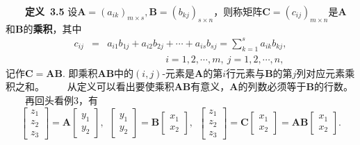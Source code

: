\documentclass[compress,mathserif,cjk]{beamer}
\theoremstyle{remark}
\numberwithin{equation}{section}
\newcommand{\hei}{\bf}      %
\begin{document}
\begin{CJK}{UTF8}{gbsn}
\begin{frame}
 \ \ \ \ {\hei 定义~3.5} 设$\bm A=(a_{ik})_{m\times s},\bm B=(b_{kj})_{s\times n}$，则称矩阵$\bm C=(c_{ij})_{m\times n}$是$\bm A$ 和$\bm B$的{\hei 乘积}，其中
 \begin{eqnarray*}
 c_{ij}&=&a_{i1}b_{1j}+a_{i2}b_{2j}+\cdots+a_{is}b_{sj}=\sum_{k=1}^sa_{ik}b_{kj},\\
 &&\hspace{6em}i=1,2,\cdots,m,~j=1,2,\cdots,n,
 \end{eqnarray*}
 记作$\bm C=\bm A\bm B$. 即乘积$\bm A\bm B$中的$(i,j)$-元素是$\bm A$的第$i$行元素与$\bm B$的第$j$列对应元素乘积之和。
 \pause\vskip 5pt
 \ \ \ \ 从定义可以看出要使乘积$\bm A\bm B$有意义，$\bm A$的列数必须等于$\bm B$的行数。
 \pause\vskip 10pt
 \ \ \ \  再回头看例3，有
 $$\left[\begin{matrix}z_1\\z_2\\z_3\end{matrix}\right]=\bm A\left[\begin{matrix}y_1\\y_2\end{matrix}\right],~~
 \left[\begin{matrix}y_1\\y_2\end{matrix}\right]=\bm B\left[\begin{matrix}x_1\\x_2\end{matrix}\right],~~
 \left[\begin{matrix}z_1\\z_2\\z_3\end{matrix}\right]=\bm C\left[\begin{matrix}x_1\\x_2\end{matrix}\right]=\bm A\bm B\left[\begin{matrix}x_1\\x_2\end{matrix}\right]. $$
\end{frame}


\end{CJK}
\end{document}
